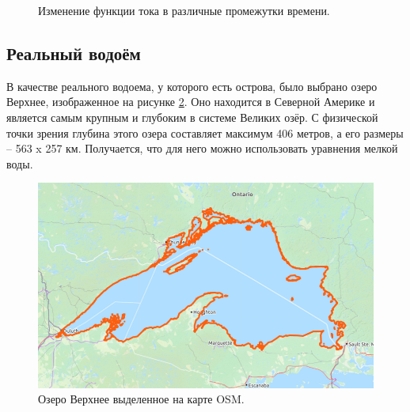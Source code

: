 \documentclass[14pt]{extreport}
\begin{document}
\begin{figure}[H]
  \centering
    \hfill
  \caption{Изменение функции тока в различные промежутки времени.}
  \label{img:ex3:psi:all}
\end{figure}

\subsection{Реальный водоём}
В качестве реального водоема, у которого есть острова, было выбрано озеро Верхнее, изображенное на рисунке \ref{img:lake:superior}. Оно находится в Северной Америке и является самым крупным и глубоким в системе Великих озёр. С физической точки зрения глубина этого озера составляет максимум 406 метров, а его размеры -- 563 x 257 км. Получается, что для него можно использовать уравнения мелкой воды.

\begin{figure}[H]
\centerline{
\includegraphics[width=0.8\linewidth]{images/ex4/lake_superior}}
\caption{Озеро Верхнее выделенное на карте OSM.}
\label{img:lake:superior}
\end{figure}
\end{document}
